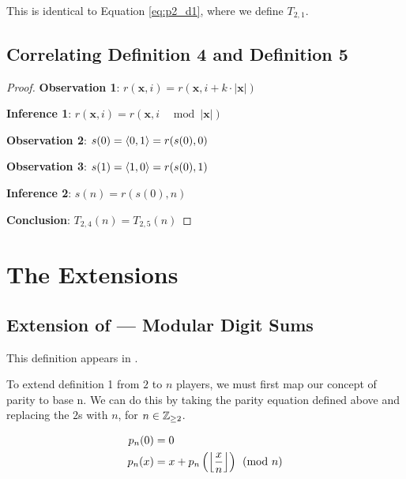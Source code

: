 \documentclass[conference]{IEEEtran}
\begin{document}
This is identical to Equation \ref{eq:p2_d1}, where we define $T_{2,1}$.

\subsection{Correlating Definition 4 and Definition 5}

\begin{proof}
\par\noindent\par
    \textbf{Observation 1}: $r(\textbf{x}, i) = r(\textbf{x}, i + k \cdot |\textbf{x}|)$

    \textbf{Inference 1}: $r(\textbf{x}, i) = r(\textbf{x}, i \;\; \mod{|\textbf{x}|})$

    \textbf{Observation 2}: $s(0) = \langle 0, 1 \rangle = r(s(0), 0)$

    \textbf{Observation 3}: $s(1) = \langle 1, 0 \rangle = r(s(0), 1)$

    \textbf{Inference 2}: $s(n) = r(s(0), n)$


    \textbf{Conclusion}: $T_{2,4}(n) = T_{2,5}(n)$
\end{proof}

\section{The Extensions}

\subsection{Extension  of \TotalExtensions\xspace --- Modular Digit Sums}

This definition appears in \cite{Astudillo_2003, Dekking_2023, OEIS-TMS-3-2, Shallit_2022, Shevelev_2017, OEIS-TMS-negabinary, Starosta_2011, Parshina_2017, Robert_2013}.

To extend definition 1 from $2$ to $n$ players, we must first map our concept of parity to base n. We can do this by taking the parity equation defined above and replacing the $2$s with $n$, for $n \in \mathbb{Z}_{\ge 2}$.

\begin{equation}
    \begin{aligned}
p_n(0) &= 0 \\
p_n(x) &= x + p_n\left(\left\lfloor \dfrac{x}{n} \right\rfloor\right) \pmod{n}
    \end{aligned}
\end{equation}
\end{document}

